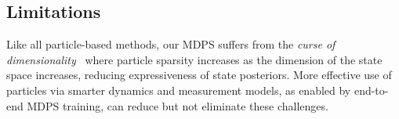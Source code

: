 
\subsection{Limitations}

    Like all particle-based methods, our MDPS suffers from the \emph{curse of dimensionality}~\cite{bellman1957dynamic} where particle sparsity increases as the dimension of the state space increases, reducing expressiveness of state posteriors. More effective use of particles via smarter dynamics and measurement models, as enabled by end-to-end MDPS training, can reduce but not eliminate these challenges.